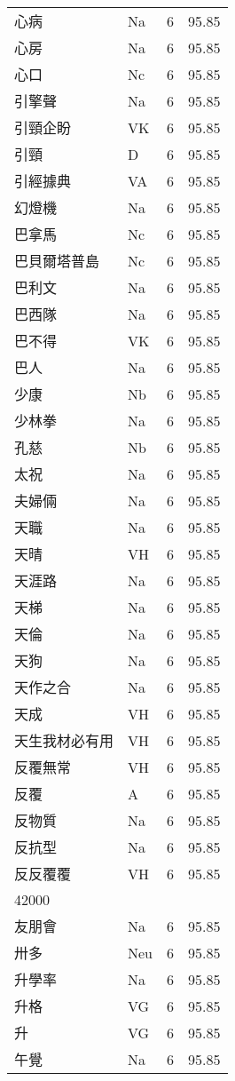 \documentclass[twocolumn]{book}
\begin{document}
\begin{supertabular}{llrr}
心病 & Na & 6 &  95.85\\
心房 & Na & 6 &  95.85\\
心口 & Nc & 6 &  95.85\\
引擎聲 & Na & 6 &  95.85\\
引頸企盼 & VK & 6 &  95.85\\
引頸 & D & 6 &  95.85\\
引經據典 & VA & 6 &  95.85\\
幻燈機 & Na & 6 &  95.85\\
巴拿馬 & Nc & 6 &  95.85\\
巴貝爾塔普島 & Nc & 6 &  95.85\\
巴利文 & Na & 6 &  95.85\\
巴西隊 & Na & 6 &  95.85\\
巴不得 & VK & 6 &  95.85\\
巴人 & Na & 6 &  95.85\\
少康 & Nb & 6 &  95.85\\
少林拳 & Na & 6 &  95.85\\
孔慈 & Nb & 6 &  95.85\\
太祝 & Na & 6 &  95.85\\
夫婦倆 & Na & 6 &  95.85\\
天職 & Na & 6 &  95.85\\
天晴 & VH & 6 &  95.85\\
天涯路 & Na & 6 &  95.85\\
天梯 & Na & 6 &  95.85\\
天倫 & Na & 6 &  95.85\\
天狗 & Na & 6 &  95.85\\
天作之合 & Na & 6 &  95.85\\
天成 & VH & 6 &  95.85\\
天生我材必有用 & VH & 6 &  95.85\\
反覆無常 & VH & 6 &  95.85\\
反覆 & A & 6 &  95.85\\
反物質 & Na & 6 &  95.85\\
反抗型 & Na & 6 &  95.85\\
反反覆覆 & VH & 6 &  95.85\\
42000\\
友朋會 & Na & 6 &  95.85\\
卅多 & Neu & 6 &  95.85\\
升學率 & Na & 6 &  95.85\\
升格 & VG & 6 &  95.85\\
升 & VG & 6 &  95.85\\
午覺 & Na & 6 &  95.85\\

\end{supertabular}
\end{document}
